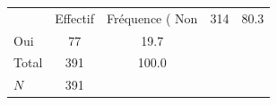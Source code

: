 {
\def\sym#1{\ifmmode^{#1}\else\(^{#1}\)\fi}
\begin{tabular}{l*{1}{cc}}
\toprule
            &    Effectif&Fréquence (%
\midrule
Non         &         314&        80.3\\
Oui         &          77&        19.7\\
Total       &         391&       100.0\\
\midrule
\(N\)       &         391&            \\
\bottomrule
\end{tabular}
}
